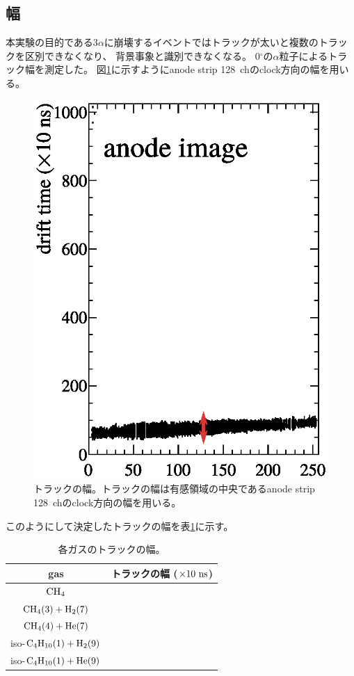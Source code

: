 \subsection{幅}
本実験の目的である3$\alpha$に崩壊するイベントではトラックが太いと複数のトラックを区別できなくなり、
背景事象と識別できなくなる。
0${}^{\circ}$の$\alpha$粒子によるトラック幅を測定した。
図\ref{fig::track_width}に示すようにanode strip 128~chのclock方向の幅を用いる。
\begin{figure}
  \centering
  \includegraphics[clip, width=0.6\columnwidth]{eps/track_width.eps}
  \caption{トラックの幅。トラックの幅は有感領域の中央であるanode strip 128~chのclock方向の幅を用いる。}
  \label{fig::track_width}
\end{figure}
このようにして決定したトラックの幅を表\ref{tab::track_width}に示す。
\begin{table}
  \centering
  \caption{各ガスのトラックの幅。}
  \label{tab::track_width}
  \begin{tabular}{cc}
    \toprule
    gas & トラックの幅 ($\times 10~{\rm ns}$)\\
    \midrule
    ${\rm CH_{4}}$                          & \\
    ${\rm CH_{4} (3) + H_{2} (7)}$          & \\
    ${\rm CH_{4} (4) + He (7)}$             & \\
    iso-${\rm C_{4}H_{10} (1) + H_{2} (9)}$ & \\
    iso-${\rm C_{4}H_{10} (1) + He (9)}$    & \\
    \bottomrule
  \end{tabular}
\end{table}

